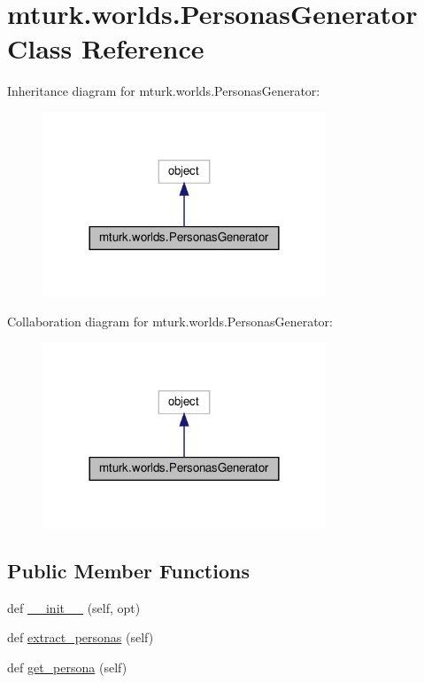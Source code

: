 \hypertarget{classmturk_1_1worlds_1_1PersonasGenerator}{}\section{mturk.\+worlds.\+Personas\+Generator Class Reference}
\label{classmturk_1_1worlds_1_1PersonasGenerator}


Inheritance diagram for mturk.\+worlds.\+Personas\+Generator\+:
\nopagebreak
\begin{figure}[H]
\begin{center}
\leavevmode
\includegraphics[width=240pt]{classmturk_1_1worlds_1_1PersonasGenerator__inherit__graph}
\end{center}
\end{figure}


Collaboration diagram for mturk.\+worlds.\+Personas\+Generator\+:
\nopagebreak
\begin{figure}[H]
\begin{center}
\leavevmode
\includegraphics[width=240pt]{classmturk_1_1worlds_1_1PersonasGenerator__coll__graph}
\end{center}
\end{figure}
\subsection*{Public Member Functions}
\begin{DoxyCompactItemize}
\item 
def \hyperlink{classmturk_1_1worlds_1_1PersonasGenerator_afbf04f8f89fa447fb05f555d8eb259d8}{\+\_\+\+\_\+init\+\_\+\+\_\+} (self, opt)
\item 
def \hyperlink{classmturk_1_1worlds_1_1PersonasGenerator_a234e5189be03d1bf81f303f5a3dfac77}{extract\+\_\+personas} (self)
\item 
def \hyperlink{classmturk_1_1worlds_1_1PersonasGenerator_a916c9cb4ea3c87296e1f08d762ca9b8a}{get\+\_\+persona} (self)
\end{DoxyCompactItemize}
